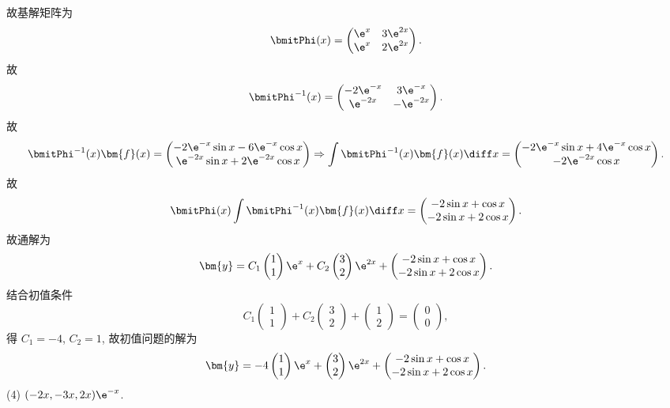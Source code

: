 \begin{solve}
  故基解矩阵为
  \[\bmitPhi(x)=\begin{pmatrix}\e^x&3\e^{2x}\\\e^x&2\e^{2x}\end{pmatrix}.\]
  故
  \[\bmitPhi^{-1}(x)=\begin{pmatrix}-2\e^{-x}&3\e^{-x}\\\e^{-2x}&-\e^{-2x}\end{pmatrix}.\]
  故
  \[\bmitPhi^{-1}(x)\bm{f}(x) =
    \begin{pmatrix}-2\e^{-x}\sin x-6\e^{-x}\cos x\\\e^{-2x}\sin x+2\e^{-2x}\cos x\end{pmatrix}
    \Rightarrow\int\bmitPhi^{-1}(x)\bm{f}(x)\diff x =
    \begin{pmatrix}-2\e^{-x}\sin x+4\e^{-x}\cos x\\-2\e^{-2x}\cos x\end{pmatrix}.\]
  故
  \[\bmitPhi(x)\int\bmitPhi^{-1}(x)\bm{f}(x)\diff x =
    \begin{pmatrix}-2\sin x+\cos x\\-2\sin x+2\cos x\end{pmatrix}.\]
  故通解为
  \[\bm{y} = C_1\begin{pmatrix}1\\1\end{pmatrix}\e^x
    + C_2\begin{pmatrix}3\\2\end{pmatrix}\e^{2x}
    + \begin{pmatrix}-2\sin x+\cos x\\-2\sin x+2\cos x\end{pmatrix}.\]
  结合初值条件
  \[C_1\begin{pmatrix}1\\1\end{pmatrix}
    + C_2\begin{pmatrix}3\\2\end{pmatrix}
    + \begin{pmatrix}1\\2\end{pmatrix}
    = \begin{pmatrix}0\\0\end{pmatrix},\]
  得 $C_1=-4$, $C_2=1$, 故初值问题的解为
  \[\bm{y} =
    - 4\begin{pmatrix}1\\1\end{pmatrix}\e^x
    + \begin{pmatrix}3\\2\end{pmatrix}\e^{2x}
    + \begin{pmatrix}-2\sin x+\cos x\\-2\sin x+2\cos x\end{pmatrix}.\]
  (4) $(-2x,-3x,2x)\e^{-x}$.
\end{solve}



